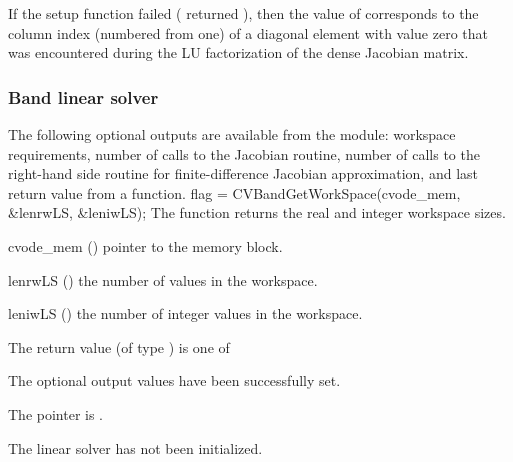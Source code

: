 {
  If the {\cvdense} setup function failed ( returned ),
  then the value of  corresponds to the column index (numbered from one)
  of a diagonal element with value zero that was encountered during the LU
  factorization of the dense Jacobian matrix.
}


\subsubsection{Band linear solver}\label{sss:optout_band}
The following optional outputs are available from the {\cvband} module:
workspace requirements, number of calls to the Jacobian routine, number of 
calls to the right-hand side routine for finite-difference Jacobian approximation,
and last return value from a {\cvband} function.
{
  flag = CVBandGetWorkSpace(cvode\_mem, \&lenrwLS, \&leniwLS);
}
{
  The function  returns the
  {\cvband} real and integer workspace sizes.
}
{
  \begin{args}
  \item[cvode\_mem] ()
    pointer to the {\cvodes} memory block.
  \item[lenrwLS] ()
    the number of  values in the {\cvband} workspace.
  \item[leniwLS] ()
    the number of integer values in the {\cvband} workspace.
  \end{args}
}
{
  The return value  (of type ) is one of
  \begin{args}
  \item[\Id{CVBAND\_SUCCESS}] 
    The optional output values have been successfully set.
  \item[\Id{CVBAND\_MEM\_NULL}]
    The  pointer is .
  \item[\Id{CVBAND\_LMEM\_NULL}]
    The {\cvband} linear solver has not been initialized.
  \end{args}
}
